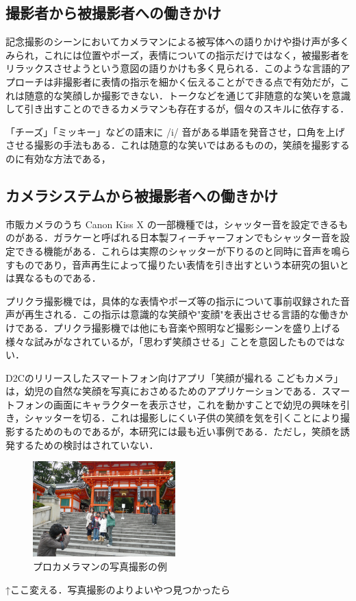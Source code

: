 \documentclass[submit,techreq]{ec2014}
\begin{document}
\subsection{撮影者から被撮影者への働きかけ}

記念撮影のシーンにおいてカメラマンによる被写体への語りかけや掛け声が多くみられ，これには位置やポーズ，表情についての指示だけではなく，被撮影者をリラックスさせようという意図の語りかけも多く見られる．このような言語的アプローチは非撮影者に表情の指示を細かく伝えることができる点で有効だが，これは随意的な笑顔しか撮影できない．トークなどを通じて非随意的な笑いを意識して引き出すことのできるカメラマンも存在するが，個々のスキルに依存する．

「チーズ」「ミッキー」などの語末に /i/ 音がある単語を発音させ，口角を上げさせる撮影の手法もある．これは随意的な笑いではあるものの，笑顔を撮影するのに有効な方法である，

\subsection{カメラシステムから被撮影者への働きかけ}


市販カメラのうち Canon Kiss X の一部機種では，シャッター音を設定できるものがある\cite{canonkissx}．ガラケーと呼ばれる日本製フィーチャーフォンでもシャッター音を設定できる機能がある．これらは実際のシャッターが下りるのと同時に音声を鳴らすものであり，音声再生によって撮りたい表情を引き出すという本研究の狙いとは異なるものである．

プリクラ撮影機では，具体的な表情やポーズ等の指示について事前収録された音声が再生される．この指示は意識的な笑顔や"変顔"を表出させる言語的な働きかけである．プリクラ撮影機では他にも音楽や照明など撮影シーンを盛り上げる様々な試みがなされているが，「思わず笑顔させる」ことを意図したものではない．

D2Cのリリースしたスマートフォン向けアプリ「笑顔が撮れる こどもカメラ」は，幼児の自然な笑顔を写真におさめるためのアプリケーションである．スマートフォンの画面にキャラクターを表示させ，これを動かすことで幼児の興味を引き，シャッターを切る．これは撮影しにくい子供の笑顔を気を引くことにより撮影するためのものであるが，本研究には最も近い事例である．ただし，笑顔を誘発するための検討はされていない．

\begin{figure}[h!]
  \centering  
\includegraphics[width=55mm, bb=0 0 680 455]{images/murataphoto-main.jpg}
\caption{プロカメラマンの写真撮影の例}
  \label{pro-cameraman}
\end{figure}
↑ここ変える．写真撮影のよりよいやつ見つかったら
\end{document}
